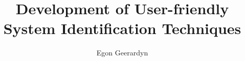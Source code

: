 \documentclass[a4paper]{memoir}
\title{Development of User-friendly System Identification Techniques}
\author{Egon Geerardyn}
\begin{document}
   \maketitle

   \tableofcontents
   \newpage
   \cite{Geerardyn2015TIM}


   

   
   
   
   
   
   
   
   

   
\end{document}

